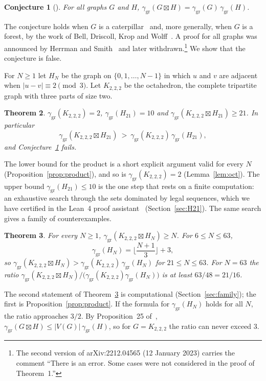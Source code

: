 \documentclass[11pt]{amsart}
\newtheorem{theorem}{Theorem}[section]
\newtheorem{conjecture}[theorem]{Conjecture}
\theoremstyle{definition}
\theoremstyle{remark}
\numberwithin{equation}{section}
\newcommand{\ggr}{\gamma_{\mathrm{gr}}}
\newcommand{\sprod}{\boxtimes}
\newcommand{\oct}{K_{2,2,2}}
\begin{document}
\begin{conjecture}[{\cite[Conjecture~22]{BBG}}]\label{conj}
For all graphs $G$ and $H$, $\ggr(G\sprod H)=\ggr(G)\,\ggr(H)$.
\end{conjecture}

The conjecture holds when $G$ is a caterpillar~\cite{BBG} and, more generally, when $G$ is a forest, by the work of Bell, Driscoll, Krop and Wolff~\cite{BDKW}. A proof for all graphs was announced by Herrman and Smith~\cite{HS} and later withdrawn.\footnote{The second version of arXiv:2212.04565 (12 January 2023) carries the comment ``There is an error. Some cases were not considered in the proof of Theorem~1.''} We show that the conjecture is false.

For $N\ge1$ let $H_N$ be the graph on $\{0,1,\dots,N-1\}$ in which $u$ and $v$ are adjacent when $|u-v|\equiv2\pmod 3$. Let $\oct$ be the octahedron, the complete tripartite graph with three parts of size two.

\begin{theorem}\label{thm:main}
$\ggr(\oct)=2$, $\ggr(H_{21})=10$ and $\ggr(\oct\sprod H_{21})\ge21$. In particular
\[
  \ggr(\oct\sprod H_{21})\ >\ \ggr(\oct)\,\ggr(H_{21}),
\]
and Conjecture~\ref{conj} fails.
\end{theorem}

The lower bound for the product is a short explicit argument valid for every $N$ (Proposition~\ref{prop:product}), and so is $\ggr(\oct)=2$ (Lemma~\ref{lem:oct}). The upper bound $\ggr(H_{21})\le10$ is the one step that rests on a finite computation: an exhaustive search through the sets dominated by legal sequences, which we have certified in the Lean~4 proof assistant~\cite{MU} (Section~\ref{sec:H21}). The same search gives a family of counterexamples.

\begin{theorem}\label{thm:family}
For every $N\ge1$, $\ggr(\oct\sprod H_N)\ge N$. For $6\le N\le 63$,
\[
  \ggr(H_N)=\Big\lfloor\frac{N+1}{3}\Big\rfloor+3 ,
\]
so $\ggr(\oct\sprod H_N)>\ggr(\oct)\,\ggr(H_N)$ for $21\le N\le 63$. For $N=63$ the ratio $\ggr(\oct\sprod H_N)/\big(\ggr(\oct)\ggr(H_N)\big)$ is at least $63/48=21/16$.
\end{theorem}

The second statement of Theorem~\ref{thm:family} is computational (Section~\ref{sec:family}); the first is Proposition~\ref{prop:product}. If the formula for $\ggr(H_N)$ holds for all $N$, the ratio approaches $3/2$. By Proposition~25 of~\cite{BBG}, $\ggr(G\sprod H)\le|V(G)|\,\ggr(H)$, so for $G=\oct$ the ratio can never exceed $3$.
\end{document}
